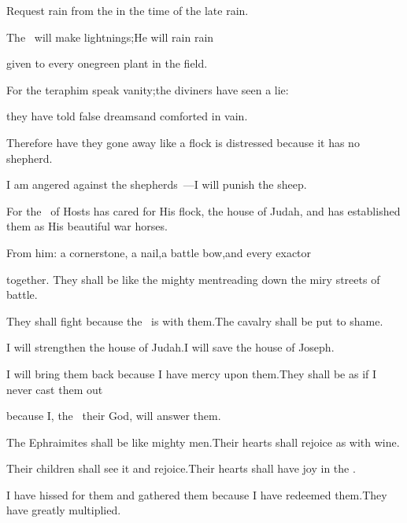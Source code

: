 
\begin{inparaenum}
  \pb{} Request rain from the \lord{}\pa{}in the time of the late rain.%

  \pb{}The \lord\ will make lightnings;\pa{}He will rain rain%

  \pb{}given to every one\pa{}green plant in the field.%

  \pb{} For the teraphim speak vanity;\pa{}the diviners have seen a lie:%

  \pb{}they have told false dreams\pa{}and comforted in vain.%

  \pb{}Therefore have they gone away like a flock \pa{}is distressed because it has no shepherd.%

  \pa{} I am angered against the shepherds~---\pa{}I will punish the sheep.%

  \pa{}For the \lord\ of Hosts has cared for His flock, the house of Judah,%
  and has established them as His beautiful war horses.%

  \pa{} From him: a cornerstone, a nail,\pa{}a battle bow,\pa{}and every exactor%

  \pa{}together.  They shall be like the mighty men\pa{}treading down the miry streets of battle.%

  \pa{}They shall fight because the \lord\ is with them.\pa{}The cavalry shall be put to shame.%

  \pa{} I will strengthen the house of Judah.\pa{}I will save the house of Joseph.%

  \pa{}I will bring them back because I have mercy upon them.\pa{}They shall be as if I never cast them out%

  \pa{}because I, the \lord\ their God, will answer them.%

  \pa{} The Ephraimites shall be like mighty men.\pa{}Their hearts shall rejoice as with wine.%

  \pa{}Their children shall see it and rejoice.\pa{}Their hearts shall have joy in the \lord.%

  \pa{} I have hissed for them and gathered them because I have redeemed them.\pa{}They have greatly multiplied.%


\end{inparaenum}
